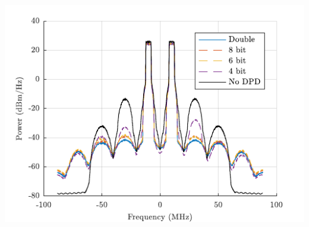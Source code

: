 \documentclass[25pt]{tikzposter} %
\begin{document}
\begin{columns}
{		\begin{tikzfigure}[]
			\label{fig:fig1}
			\centering
			\includegraphics[width=12in]{../TEX/FullBandPSD.pdf}
		\end{tikzfigure}

	}







\end{columns}
\end{document}
